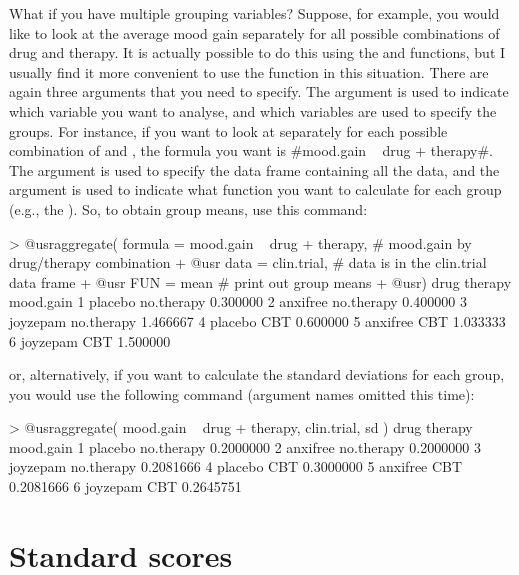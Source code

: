 What if you have multiple grouping variables? Suppose, for example, you would like to look at the average mood gain separately for all possible combinations of drug and therapy. It is actually possible to do this using the  and  functions, but I usually find it more convenient to use the  function in this situation. There are again three arguments that you need to specify. The  argument is used to indicate which variable you want to analyse, and which variables are used to specify the groups. For instance, if you want to look at  separately for each possible combination of  and , the formula you want is \rtextverb#mood.gain ~ drug + therapy#. The  argument is used to specify the data frame containing all the data, and the  argument is used to indicate what function you want to calculate for each group (e.g., the ). So, to obtain group means, use this command:
\begin{rblock1}
> @usr{aggregate( formula = mood.gain ~ drug + therapy,}  # mood.gain by drug/therapy combination
+ @usr{           data = clin.trial, }                    # data is in the clin.trial data frame
+ @usr{           FUN = mean}                             # print out group means
+ @usr{)}
      drug    therapy mood.gain
1  placebo no.therapy  0.300000
2 anxifree no.therapy  0.400000
3 joyzepam no.therapy  1.466667
4  placebo        CBT  0.600000
5 anxifree        CBT  1.033333
6 joyzepam        CBT  1.500000
\end{rblock1}
or, alternatively, if you want to calculate the standard deviations for each group, you would use the following command (argument names omitted this time):
\begin{rblock1}
> @usr{aggregate( mood.gain ~ drug + therapy, clin.trial, sd )}
      drug    therapy mood.gain
1  placebo no.therapy 0.2000000
2 anxifree no.therapy 0.2000000
3 joyzepam no.therapy 0.2081666
4  placebo        CBT 0.3000000
5 anxifree        CBT 0.2081666
6 joyzepam        CBT 0.2645751
\end{rblock1}




\section{Standard scores~\label{sec:zscore}}


